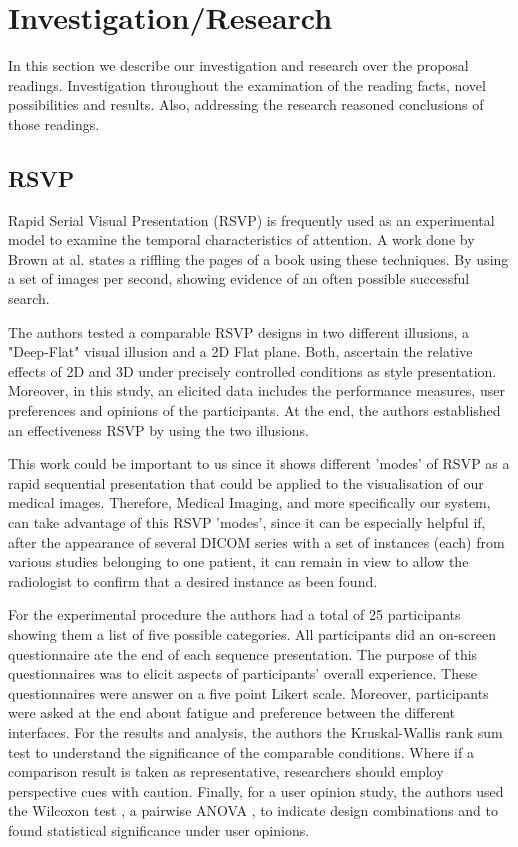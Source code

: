 \section{Investigation/Research}

In this section we describe our investigation and research over the proposal readings. Investigation throughout the examination of the reading facts, novel possibilities and results. Also, addressing the research reasoned conclusions of those readings.

\subsection{RSVP}

Rapid Serial Visual Presentation (RSVP) is frequently used as an experimental model to examine the temporal characteristics of attention. A work done by Brown at al. \cite{brown2017role} states a riffling the pages of a book using these techniques. By using a set of images per second, showing evidence of an often possible successful search.

The authors tested a comparable RSVP designs in two different illusions, a "Deep-Flat" visual illusion and a 2D Flat plane. Both, ascertain the relative effects of 2D and 3D under precisely controlled conditions as style presentation. Moreover, in this study, an elicited data includes the performance measures, user preferences and opinions of the participants. At the end, the authors established an effectiveness RSVP by using the two illusions.

This work could be important to us since it shows different 'modes' of RSVP as a rapid sequential presentation that could be applied to the visualisation of our medical images. Therefore, Medical Imaging, and more specifically our system, can take advantage of this RSVP 'modes', since it can be especially helpful if, after the appearance of several DICOM \cite{mildenberger2002introduction, pianykh2009digital} series with a set of instances (each) from various studies belonging to one patient, it can remain in view to allow the radiologist to confirm that a desired instance as been found.

For the experimental procedure the authors had a total of 25 participants showing them a list of five possible categories. All participants did an on-screen questionnaire ate the end of each sequence presentation. The purpose of this questionnaires was to elicit aspects of participants' overall experience. These questionnaires were answer on a five point Likert scale. Moreover, participants were asked at the end about fatigue and preference between the different interfaces. For the results and analysis, the authors the Kruskal-Wallis rank sum test \cite{theodorsson1986kruskal} to understand the significance of the comparable conditions. Where if a comparison result is taken as representative, researchers should employ perspective cues with caution. Finally, for a user opinion study, the authors used the Wilcoxon test \cite{wilcoxon1945individual}, a pairwise ANOVA \cite{hoaglin1978hat}, to indicate design combinations and to found statistical significance under user opinions.

